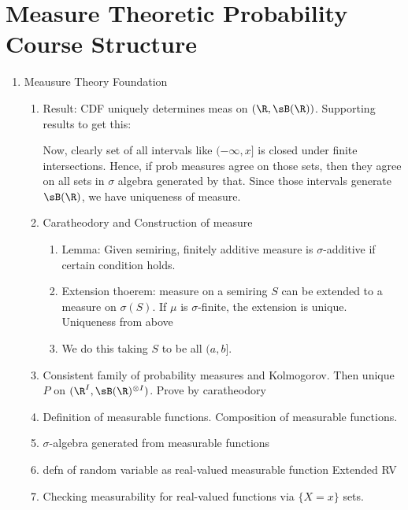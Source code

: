 \documentclass[12pt]{article}
\theoremstyle{plain}
\theoremstyle{definition}
\theoremstyle{remark}
\begin{document}
\clearpage
\section{Measure Theoretic Probability Course Structure}

\begin{enumerate}
  \item Meausure Theory Foundation
  \begin{enumerate}
    \item
      Result: CDF uniquely determines meas on $(\R,\sB(\R))$.
      Supporting results to get this:

      Now, clearly set of all intervals like $(-\infty,x]$ is closed
      under finite intersections. Hence, if prob measures agree on those
      sets, then they agree on all sets in $\sigma$ algebra generated by
      that.  Since those intervals generate $\sB(\R)$, we have
      uniqueness of measure.

    \item
      Caratheodory and Construction of measure
      \begin{enumerate}
        \item Lemma:
          Given semiring, finitely additive measure is $\sigma$-additive
          if certain condition holds.
        \item
          Extension thoerem: measure on a semiring $S$ can be extended to
          a measure on $\sigma(S)$.
          If $\mu$ is $\sigma$-finite, the extension is unique.
          Uniqueness from above
        \item We do this taking $S$ to be all $(a,b]$.
      \end{enumerate}

    \item Consistent family of probability measures and Kolmogorov.
      Then unique $P$ on $(\R^I,\sB(\R)^{\otimes I})$.
      Prove by caratheodory

    \item
      Definition of measurable functions.
      Composition of measurable functions.

    \item $\sigma$-algebra generated from measurable functions

    \item defn of random variable as real-valued measurable function
      Extended RV

    \item Checking measurability for real-valued functions via $\{X=x\}$
      sets.


\end{enumerate}
\end{enumerate}
\end{document}
